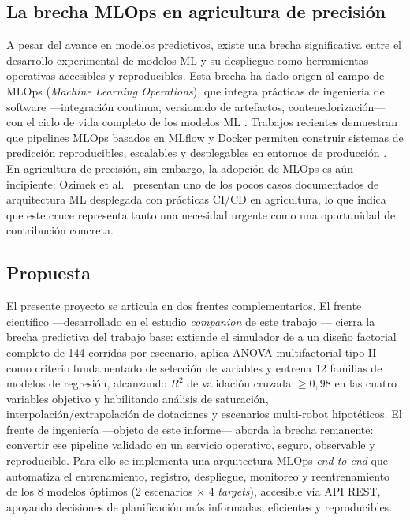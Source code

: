 \documentclass[conference]{IEEEtran}
\begin{document}
\subsection{La brecha MLOps en agricultura de precisión}

A pesar del avance en modelos predictivos, existe una brecha significativa entre el desarrollo experimental de modelos ML y su despliegue como herramientas operativas accesibles y reproducibles. Esta brecha ha dado origen al campo de MLOps (\textit{Machine Learning Operations}), que integra prácticas de ingeniería de software —integración continua, versionado de artefactos, contenedorización— con el ciclo de vida completo de los modelos ML \cite{autodrift2025}. Trabajos recientes demuestran que pipelines MLOps basados en MLflow y Docker permiten construir sistemas de predicción reproducibles, escalables y desplegables en entornos de producción \cite{arunkumar2025,singh2025}. En agricultura de precisión, sin embargo, la adopción de MLOps es aún incipiente: Ozimek et al.\ \cite{ozimek2026} presentan uno de los pocos casos documentados de arquitectura ML desplegada con prácticas CI/CD en agricultura, lo que indica que este cruce representa tanto una necesidad urgente como una oportunidad de contribución concreta.

\subsection{Propuesta}

El presente proyecto se articula en dos frentes complementarios. El frente científico —desarrollado en el estudio \textit{companion} de este trabajo \cite{garcia2026}— cierra la brecha predictiva del trabajo base: extiende el simulador de \cite{vasconez2022} a un diseño factorial completo de 144 corridas por escenario, aplica ANOVA multifactorial tipo II como criterio fundamentado de selección de variables \cite{langsrud2003} y entrena 12 familias de modelos de regresión, alcanzando $R^2$ de validación cruzada $\geq 0{,}98$ en las cuatro variables objetivo y habilitando análisis de saturación, interpolación/extrapolación de dotaciones y escenarios multi-robot hipotéticos. El frente de ingeniería —objeto de este informe— aborda la brecha remanente: convertir ese pipeline validado en un servicio operativo, seguro, observable y reproducible. Para ello se implementa una arquitectura MLOps \textit{end-to-end} que automatiza el entrenamiento, registro, despliegue, monitoreo y reentrenamiento de los 8 modelos óptimos (2 escenarios $\times$ 4 \textit{targets}), accesible vía API REST, apoyando decisiones de planificación más informadas, eficientes y reproducibles.
\end{document}
